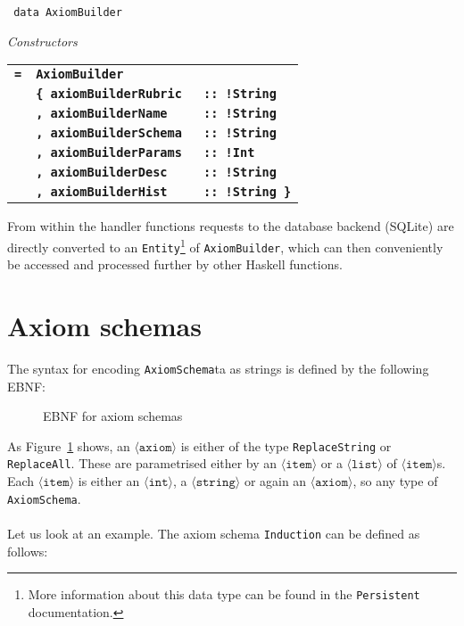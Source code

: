\documentclass[notitlepage]{report}
\newcommand\m[1]{\texttt{#1}}
\begin{document}
\newcommand{\htt}[1]{{\small\bfseries\texttt{#1}}}

\begin{haddockdesc}
\item[\texttt{
data AxiomBuilder
}]
{\haddockbegindoc
\enspace \emph{Constructors}\par
\begin{tabulary}{\linewidth}{@{}llJ@{}}
    \htt{=}  &   \htt{AxiomBuilder}         &                 \\
             &   \htt{\{  axiomBuilderRubric } &\htt{:: !String} \\
             &   \htt{,   axiomBuilderName   } &\htt{:: !String} \\
             &   \htt{,   axiomBuilderSchema } &\htt{:: !String} \\
             &   \htt{,   axiomBuilderParams } &\htt{:: !Int   } \\
             &   \htt{,   axiomBuilderDesc   } &\htt{:: !String} \\
             &   \htt{,   axiomBuilderHist   } &\htt{:: !String \}}
 \end{tabulary}}
\end{haddockdesc}

From within the handler functions requests to the database backend (SQLite) are
directly converted to an \m{Entity}\footnote{More information about this data
type can be found in the \texttt{Persistent} documentation.} of \m{AxiomBuilder},
which can then conveniently be accessed and processed further by other Haskell
functions.

\pagebreak
\section{Axiom schemas}\label{sec:axiom_schemas}

The syntax for encoding \m{AxiomSchema}ta as strings is defined by the following
EBNF:
\begin{figure}[h!]
    {\renewcommand{\arraystretch}{2.0}
    }
    \caption{EBNF for axiom schemas}\label{fig:EBNFaxiom}
\end{figure}

As Figure~\ref{fig:EBNFaxiom} shows, an $\langle \texttt{axiom} \rangle$ is either
of the type \m{ReplaceString} or \m{ReplaceAll}. These are parametrised either
by an $\langle \texttt{item} \rangle$ or a $\langle \texttt{list} \rangle$
of $\langle \texttt{item} \rangle$s. Each $\langle \texttt{item} \rangle$ is
either an $\langle \texttt{int} \rangle$, a $\langle \texttt{string} \rangle$
or again an $\langle \texttt{axiom} \rangle$, so any type of \m{AxiomSchema}.
\\\\
Let us look at an example. The axiom schema \texttt{Induction} can be defined as
follows:
\end{document}
